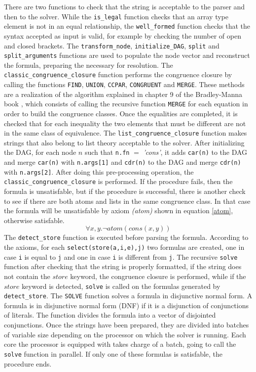 \documentclass{IEEEtran}
\begin{document}
There are two functions to check that the string is acceptable to the parser and then to the solver. While the \verb|is_legal| function checks that an array type element is not in an equal relationship, the \verb|well_formed| function checks that the syntax accepted as input is valid, for example by checking the number of open and closed brackets. The \verb|transform_node|, \verb|initialize_DAG|, \verb|split| and \verb|split_arguments| functions are used to populate the node vector and reconstruct the formula, preparing the necessary for resolution. The \verb|classic_congruence_closure| function performs the congruence closure by calling the functions \verb|FIND|, \verb|UNION|, \verb|CCPAR|, \verb|CONGRUENT| and \verb|MERGE|. These methods are a realization of the algorithm explained in chapter 9 of the Bradley-Manna book \cite{10.5555/1324777}, which consists of calling the recursive function \verb|MERGE| for each equation in order to build the congruence classes. Once the equalities are completed, it is checked that for each inequality the two elements that must be different are not in the same class of equivalence. The \verb|list_congruence_closure| function makes strings that also belong to list theory acceptable to the solver. After initializing the DAG, for each node $n$ such that \verb|n.fn| $=$ \textit{'cons'}, it adds \verb|car(n)| to the DAG and merge \verb|car(n)| with \verb|n.args[1]| and \verb|cdr(n)| to the DAG and merge \verb|cdr(n)| with \verb|n.args[2]|. After doing this pre-processing operation, the \verb|classic_congruence_closure| is performed. If the procedure fails, then the formula is unsatisfable, but if the procedure is successful, there is another check to see if there are both atoms and lists in the same congruence class. In that case the formula will be unsatisfable by axiom \textit{(atom)} shown in equation \ref{atom}, otherwise satisfable.
\begin{equation}
	\label{atom}
	\forall x,y. \neg atom(cons(x,y))
\end{equation}
The \verb|detect_store| function is executed before parsing the formula. According to the axioms, for each \verb|select(store(a,i,e),j)| two formulas are created, one in case \verb|i| is equal to \verb|j| and one in case \verb|i| is different from \verb|j|. The recursive \verb|solve| function after checking that the string is properly formatted, if the string does not contain the $store$ keyword, the congruence closure is performed, while if the $store$ keyword is detected, \verb|solve| is called on the formulas generated by \verb|detect_store|. The \verb|SOLVE| function solves a formula in disjunctive normal form. A formula is in disjunctive normal form (DNF) if it is a disjunction of conjunctions of literals. The function divides the formula into a vector of disjointed conjunctions. Once the strings have been prepared, they are divided into batches of variable size depending on the processor on which the solver is running. Each core the processor is equipped with takes charge of a batch, going to call the \verb|solve| function in parallel. If only one of these formulas is satisfable, the procedure ends.
\end{document}
